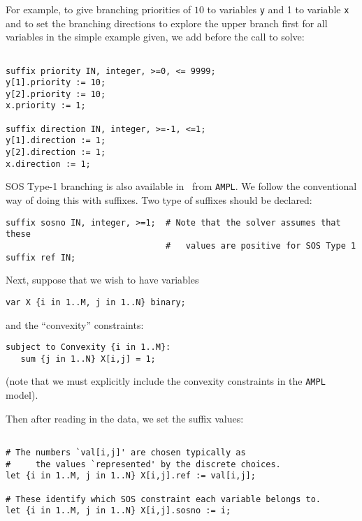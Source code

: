 For example, to give branching priorities of $10$ to variables {\tt y} and 1 to variable {\tt x}
and to set the branching directions to explore the upper branch first for all variables
in the simple example given, we add before the call to solve:
\begin{colorverb}
\begin{verbatim}

suffix priority IN, integer, >=0, <= 9999;
y[1].priority := 10;
y[2].priority := 10;
x.priority := 1;

suffix direction IN, integer, >=-1, <=1;
y[1].direction := 1;
y[2].direction := 1;
x.direction := 1;

\end{verbatim}
\end{colorverb}

SOS Type-1 branching is also available in \Bonmin\ from {\tt AMPL}. We
follow the conventional way of doing this with suffixes.
Two type of suffixes should be declared:

\begin{colorverb}
\begin{verbatim}
suffix sosno IN, integer, >=1;  # Note that the solver assumes that these
                                #   values are positive for SOS Type 1
suffix ref IN;
\end{verbatim}
\end{colorverb}

Next, suppose that we wish to have variables

\begin{colorverb}
\begin{verbatim}
var X {i in 1..M, j in 1..N} binary;
\end{verbatim}
\end{colorverb}
and the ``convexity'' constraints:

\begin{colorverb}
\begin{verbatim}
subject to Convexity {i in 1..M}:
   sum {j in 1..N} X[i,j] = 1;
\end{verbatim}
\end{colorverb}

(note that we must explicitly include the convexity constraints in the {\tt AMPL} model).

Then after reading in the data, we set the suffix values:
\begin{colorverb}
\begin{verbatim}

# The numbers `val[i,j]' are chosen typically as
#     the values `represented' by the discrete choices.
let {i in 1..M, j in 1..N} X[i,j].ref := val[i,j];

# These identify which SOS constraint each variable belongs to.
let {i in 1..M, j in 1..N} X[i,j].sosno := i;
\end{verbatim}
\end{colorverb}

